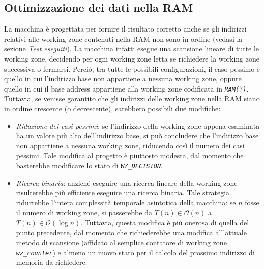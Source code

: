 \documentclass[12pt,a4paper,titlepage]{article}
\begin{document}
		\subsection{Ottimizzazione dei dati nella RAM} \label{sec:ottimizzazione}
			La macchina è progettata per fornire il risultato corretto anche se gli indirizzi relativi alle working zone contenuti nella RAM non sono in ordine $($vedasi la sezione \hyperref[sec:test]{\textit{Test eseguiti}}$)$. %
			La macchina infatti esegue una scansione lineare di tutte le working zone, decidendo per ogni working zone letta se richiedere la working zone successiva o fermarsi. Perciò, tra tutte le possibili configurazioni, il caso pessimo è quello in cui l'indirizzo base non appartiene a nessuna working zone, oppure quello in cui il base address appartiene alla working zone codificata in \textit{\texttt{RAM($7$)}}.
			Tuttavia, se venisse garantito che gli indirizzi delle working zone nella RAM siano in ordine crescente (o decrescente), sarebbero possibili due modifiche:
			\begin{itemize}
			
			\item \textit{Riduzione dei casi pessimi}: se l'indirizzo della working zone appena esaminata ha un valore più alto dell'indirizzo base, si può concludere che l'indirizzo base non appartiene a nessuna working zone, riducendo così il numero dei casi pessimi. Tale modifica al progetto è piuttosto modesta, dal momento che basterebbe modificare lo stato di \textit{\texttt{WZ\_DECISION}}.
			
			\item \textit{Ricerca binaria}: anziché eseguire una ricerca lineare della working zone risulterebbe più efficiente eseguire una ricerca binaria. Tale strategia ridurrebbe l'intera complessità temporale asintotica della macchina: se $n$ fosse il numero di working zone, si passerebbe da $T(n) \in \mathcal{O}(n)$ a $T(n) \in \mathcal{O}(\log n)$. Tuttavia, questa modifica è più onerosa di quella del punto precedente, dal momento che richiederebbe una modifica all'attuale metodo di scansione (affidato al semplice contatore di working zone \textit{\texttt{wz\_counter}}) e almeno un nuovo stato per il calcolo del prossimo indirizzo di memoria da richiedere. 
			\end{itemize}
\end{document}
